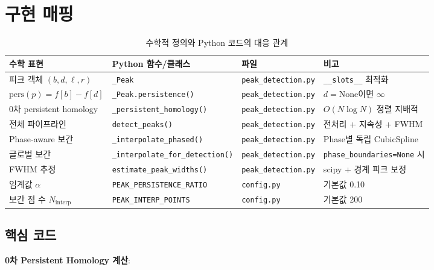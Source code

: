 \documentclass[11pt]{article}
\begin{document}
\section{구현 매핑}

\begin{table}[h]
\centering
\caption{수학적 정의와 Python 코드의 대응 관계}
\label{tab:mapping}
\small
\begin{tabularx}{\textwidth}{lll>{\raggedright\arraybackslash}X}
\toprule
수학 표현 & Python 함수/클래스 & 파일 & 비고 \\
\midrule
피크 객체 $(b, d, \ell, r)$ & \texttt{\_Peak} & \texttt{peak\_detection.py} & \texttt{\_\_slots\_\_} 최적화 \\
$\mathrm{pers}(p) = f[b] - f[d]$ & \texttt{\_Peak.persistence()} & \texttt{peak\_detection.py} & $d = \mathrm{None}$이면 $\infty$ \\
0차 persistent homology & \texttt{\_persistent\_homology()} & \texttt{peak\_detection.py} & $O(N \log N)$ 정렬 지배적 \\
전체 파이프라인 & \texttt{detect\_peaks()} & \texttt{peak\_detection.py} & 전처리 + 지속성 + FWHM \\
Phase-aware 보간 & \texttt{\_interpolate\_phased()} & \texttt{peak\_detection.py} & Phase별 독립 CubicSpline \\
글로벌 보간 & \texttt{\_interpolate\_for\_detection()} & \texttt{peak\_detection.py} & \texttt{phase\_boundaries=None} 시 \\
FWHM 추정 & \texttt{estimate\_peak\_widths()} & \texttt{peak\_detection.py} & scipy + 경계 피크 보정 \\
임계값 $\alpha$ & \texttt{PEAK\_PERSISTENCE\_RATIO} & \texttt{config.py} & 기본값 0.10 \\
보간 점 수 $N_{\mathrm{interp}}$ & \texttt{PEAK\_INTERP\_POINTS} & \texttt{config.py} & 기본값 200 \\
\bottomrule
\end{tabularx}
\end{table}


\subsection{핵심 코드}

\textbf{0차 Persistent Homology 계산}:
\end{document}
